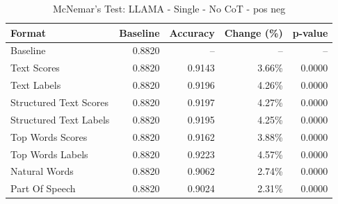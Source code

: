 \begin{table}[htbp]
\centering
\caption{McNemar's Test: LLAMA - Single - No CoT - pos neg}
\label{tab:llama-single-no_chain_of_thought-pos_neg}
\begin{tabular}{lrrrr}
\toprule
Format & Baseline & Accuracy & Change (\%) & p-value \\
\midrule
Baseline & 0.8820 & -- & -- & -- \\
Text Scores & 0.8820 & 0.9143 & 3.66\% & 0.0000 \\
Text Labels & 0.8820 & 0.9196 & 4.26\% & 0.0000 \\
Structured Text Scores & 0.8820 & 0.9197 & 4.27\% & 0.0000 \\
Structured Text Labels & 0.8820 & 0.9195 & 4.25\% & 0.0000 \\
Top Words Scores & 0.8820 & 0.9162 & 3.88\% & 0.0000 \\
Top Words Labels & 0.8820 & 0.9223 & 4.57\% & 0.0000 \\
Natural Words & 0.8820 & 0.9062 & 2.74\% & 0.0000 \\
Part Of Speech & 0.8820 & 0.9024 & 2.31\% & 0.0000 \\
\bottomrule
\end{tabular}
\end{table}